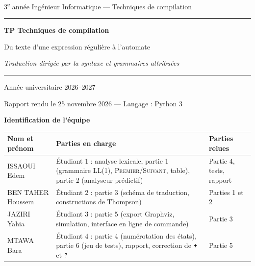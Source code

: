 \documentclass[12pt,a4paper]{article}
\newcommand{\Prem}{\textsc{Premier}}
\newcommand{\Suiv}{\textsc{Suivant}}
\newcommand{\tok}[1]{\ensuremath{\text{\fontsize{10}{12}\selectfont\ttfamily #1}}}
\begin{document}
\begin{titlepage}
\centering
\vspace*{1.2cm}
{\fontsize{14}{17}\selectfont\color{gris} 3\textsuperscript{e} année Ingénieur Informatique --- Techniques de compilation\par}
\vspace{2.2cm}
{\color{bleu}\rule{\linewidth}{1pt}\par}
\vspace{0.5cm}
{\fontsize{24}{29}\selectfont\bfseries\color{bleu} TP Techniques de compilation\par}
\vspace{0.4cm}
{\fontsize{18}{22}\selectfont\color{bleu} Du texte d'une expression régulière à l'automate\par}
\vspace{0.3cm}
{\fontsize{12}{15}\selectfont\itshape Traduction dirigée par la syntaxe et grammaires attribuées\par}
\vspace{0.5cm}
{\color{bleu}\rule{\linewidth}{1pt}\par}
\vspace{1.2cm}
{\fontsize{14}{17}\selectfont Année universitaire 2026--2027\par}
\vspace{0.3cm}
{Rapport rendu le 25 novembre 2026 --- Langage : Python 3\par}
\vspace{1.6cm}
{\fontsize{14}{17}\selectfont\bfseries\color{bleu} Identification de l'équipe\par}
\vspace{0.4cm}
{\small
\begin{tabularx}{\linewidth}{>{\raggedright\arraybackslash}p{3.6cm} L >{\raggedright\arraybackslash}p{3.4cm}}
\toprule
Nom et prénom & Parties en charge & Parties relues \\
\midrule
ISSAOUI Edem & Étudiant 1 : analyse lexicale, partie 1 (grammaire LL(1), \Prem/\Suiv, table), partie 2 (analyseur prédictif) & Partie 4, tests, rapport \\ \addlinespace
BEN TAHER Houssem & Étudiant 2 : partie 3 (schéma de traduction, constructions de Thompson) & Parties 1 et 2 \\ \addlinespace
JAZIRI Yahia & Étudiant 3 : partie 5 (export Graphviz, simulation, interface en ligne de commande) & Partie 3 \\ \addlinespace
MTAWA Bara & Étudiant 4 : partie 4 (numérotation des états), partie 6 (jeu de tests), rapport, correction de \tok{+} et \tok{?} & Partie 5 \\
\bottomrule
\end{tabularx}\par}
\vfill
\end{titlepage}
\end{document}
